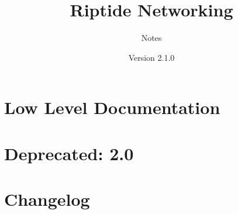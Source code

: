 \documentclass[12pt,pdftex,a4paper]{scrbook}
\begin{document}
	\thispagestyle{empty}
	\title{Riptide Networking}
	\subtitle{Notes}
	\author{Version 2.1.0}
	\maketitle
	
	\newpage
	\tableofcontents
	
	\part{Low Level Documentation}
	
	
	
	
	\part{Deprecated: 2.0}
	
	
	
	
	\part{Changelog}
	
	
	
\end{document}
